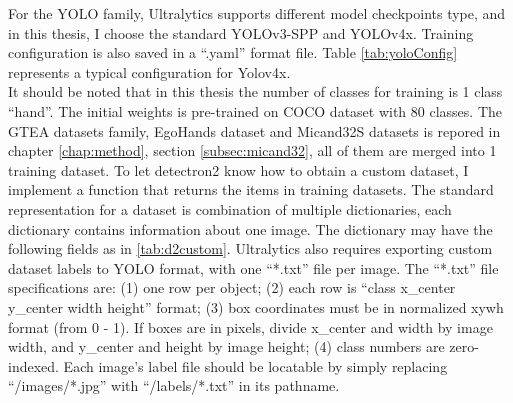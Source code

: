 For the YOLO family, Ultralytics supports different model checkpoints type, and in this thesis, I choose the standard YOLOv3-SPP and YOLOv4x. Training configuration is also saved in a “.yaml” format file. Table \ref{tab:yoloConfig} represents a typical configuration for Yolov4x.
\\It should be noted that in this thesis the number of classes for training is 1 class “hand”. The initial weights is pre-trained on COCO dataset with 80 classes. The GTEA datasets family, EgoHands dataset and Micand32S datasets is repored in chapter \ref{chap:method}, section \ref{subsec:micand32}, all of them are merged into 1 training dataset. To let detectron2 know how to obtain a custom dataset, I implement a function that returns the items in training datasets. The standard representation for a dataset is combination of multiple dictionaries, each dictionary contains information about one image. The dictionary may have the following fields as in \ref{tab:d2custom}.
Ultralytics also requires exporting custom dataset labels to YOLO format, with one “*.txt” file per image. The “*.txt” file specifications are: (1) one row per object; (2) each row is “class x\_center y\_center width height” format; (3) box coordinates must be in normalized xywh format (from 0 - 1). If boxes are in pixels, divide x\_center and width by image width, and y\_center and height by image height; (4) class numbers are zero-indexed. Each image's label file should be locatable by simply replacing “/images/*.jpg” with “/labels/*.txt” in its pathname.


